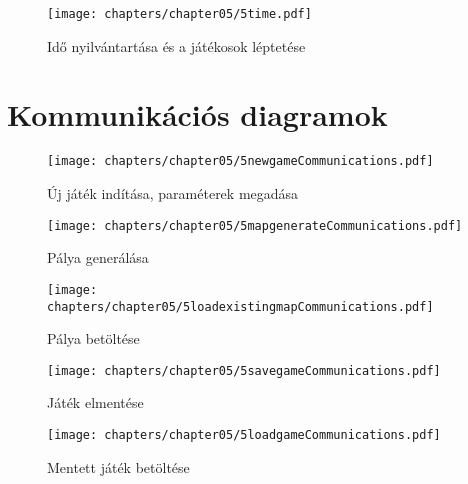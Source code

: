 \begin{figure}[h]
	\begin{center}
		\texttt{[image: chapters/chapter05/5time.pdf]}
		\caption{Idő nyilvántartása és a játékosok léptetése}
		\label{fig:5time}
	\end{center}
\end{figure}
\clearpage

\section{Kommunikációs diagramok}


\begin{figure}[h]
	\begin{center}
		\texttt{[image: chapters/chapter05/5newgameCommunications.pdf]}
		\caption{Új játék indítása, paraméterek megadása}
		\label{fig:5newgameCommunication}
	\end{center}
\end{figure}

\begin{figure}[h]
	\begin{center}
		\texttt{[image: chapters/chapter05/5mapgenerateCommunications.pdf]}
		\caption{Pálya generálása}
		\label{fig:5mapgenerateCommunication}
	\end{center}
\end{figure}

\begin{figure}[h]
	\begin{center}
		\texttt{[image: chapters/chapter05/5loadexistingmapCommunications.pdf]}
		\caption{Pálya betöltése}
		\label{fig:5loadexistingmapCommunication}
	\end{center}
\end{figure}

\begin{figure}[h]
	\begin{center}
		\texttt{[image: chapters/chapter05/5savegameCommunications.pdf]}
		\caption{Játék elmentése}
		\label{fig:5savegameCommunication}
	\end{center}
\end{figure}



\begin{figure}[h]
	\begin{center}
		\texttt{[image: chapters/chapter05/5loadgameCommunications.pdf]}
		\caption{Mentett játék betöltése}
		\label{fig:5loadgameCommunication}
	\end{center}
\end{figure}

